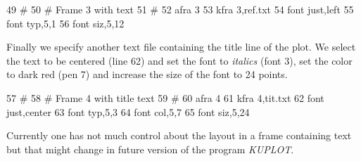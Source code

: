 \begin{MacVerbatim}
    49  #
    50  # Frame 3 with text
    51  #
    52  afra 3
    53  kfra 3,ref.txt
    54  font just,left
    55  font typ,5,1
    56  font siz,5,12
\end{MacVerbatim}

Finally we specify another text file containing the title line of
the plot. We select the text to be centered (line 62) and set the
font to {\it italics} (font 3), set the color to dark red (pen 7)
and increase the size of the font to 24 points.

\begin{MacVerbatim}
    57  #
    58  # Frame 4 with title text
    59  #
    60  afra 4
    61  kfra 4,tit.txt
    62  font just,center
    63  font typ,5,3
    64  font col,5,7
    65  font siz,5,24
\end{MacVerbatim}

Currently one has not much control about the layout in a frame containing
text but that might change in future version of the program {\it KUPLOT}.

